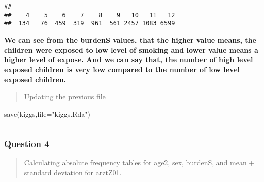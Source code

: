 \documentclass[
]{article}
\newenvironment{Shaded}{\begin{snugshade}}{\end{snugshade}}
\newcommand{\AttributeTok}[1]{\textcolor[rgb]{0.77,0.63,0.00}{#1}}
\newcommand{\FunctionTok}[1]{\textcolor[rgb]{0.00,0.00,0.00}{#1}}
\newcommand{\NormalTok}[1]{#1}
\newcommand{\OtherTok}[1]{\textcolor[rgb]{0.56,0.35,0.01}{#1}}
\newcommand{\SpecialCharTok}[1]{\textcolor[rgb]{0.00,0.00,0.00}{#1}}
\newcommand{\StringTok}[1]{\textcolor[rgb]{0.31,0.60,0.02}{#1}}
\begin{document}
\begin{Shaded}
\end{Shaded}

\begin{verbatim}
## 
##    4    5    6    7    8    9   10   11   12 
##  134   76  459  319  961  561 2457 1083 6599
\end{verbatim}

\textbf{We can see from the burdenS values, that the higher value means,
the children were exposed to low level of smoking and lower value means
a higher level of expose. And we can say that, the number of high level
exposed children is very low compared to the number of low level exposed
children.}

\begin{quote}
Updating the previous file
\end{quote}

\begin{Shaded}
\begin{Highlighting}[]
\FunctionTok{save}\NormalTok{(kiggs,}\AttributeTok{file=}\StringTok{"kiggs.Rda"}\NormalTok{)}
\end{Highlighting}
\end{Shaded}

\begin{center}\rule{0.5\linewidth}{0.5pt}\end{center}

\hypertarget{question-4}{%
\subsubsection{Question 4}\label{question-4}}

\begin{quote}
Calculating absolute frequency tables for age2, sex, burdenS, and mean +
standard deviation for arztZ01.
\end{quote}
\end{document}
